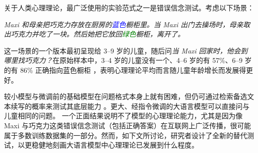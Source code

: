 关于人类心理理论，最广泛使用的实验范式之一是错误信念测试。考虑以下场景：

\begin{tcolorbox}[
    colback=white,
    arc=4pt,
    boxrule=0.5pt,
]
\small\textit{Maxi 和母亲把巧克力存放在厨房的\textcolor{blue}{蓝色}橱柜里。当 Maxi 出门去操场时，母亲取出巧克力并吃了一块。然后她把它放回\textcolor{green}{绿色}橱柜，离开了。}
\end{tcolorbox}

\noindent
这一场景的一个版本最初呈现给 3–9 岁的儿童，随后问{\em 当 Maxi 回家时，他会到哪里找巧克力？}在原始样本中，3–4 岁的儿童没有一个、4–6 岁的有 57\%、6–9 岁的有 86\% 正确指向蓝色橱柜 \citep{wimmer1983beliefs}，表明心理理论平均而言随儿童年龄增长而发展得更好。

较小模型与微调前的基础模型在问题格式本身上就有困难，但仍可通过检索备选文本续写的概率来测试其底层能力 \citep{kouwenhoven2026traces}。更大、经指令微调的大语言模型可以直接问与儿童相同的问题。
一个正面结果说明不了模型的心理理论能力，尤其是因为像 Maxi 与巧克力这类错误信念测试（包括正确答案）在互联网上广泛传播，很可能属于多数训练数据集的一部分。然而，如下文所讨论，研究者设计了全新的替代测试，以更稳健地刻画大语言模型中心理理论已发展到什么程度。



